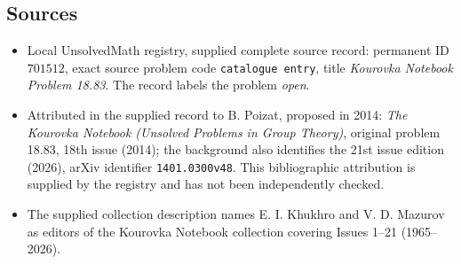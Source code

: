 \documentclass[11pt]{article}
\begin{document}
\subsection{Sources}
\begin{itemize}
\item Local UnsolvedMath registry, supplied complete source record: permanent ID \(701512\), exact source problem code \texttt{catalogue entry}, title \emph{Kourovka Notebook Problem 18.83}. The record labels the problem \emph{open}.
\item Attributed in the supplied record to B. Poizat, proposed in 2014: \emph{The Kourovka Notebook (Unsolved Problems in Group Theory)}, original problem 18.83, 18th issue (2014); the background also identifies the 21st issue edition (2026), arXiv identifier \texttt{1401.0300v48}. This bibliographic attribution is supplied by the registry and has not been independently checked.
\item The supplied collection description names E. I. Khukhro and V. D. Mazurov as editors of the Kourovka Notebook collection covering Issues 1--21 (1965--2026).
\end{itemize}
\end{document}
